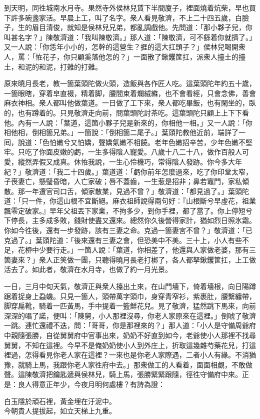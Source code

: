 到天明，同徃城南水月寺。果然寺外侯林兒賃下半間廈子，{}裡面燒着炕柴，早也買下許多碗盞家活。早晨上工，叫了名字。衆人看見敬濟，不上二十四五歲，白臉子，生的眉目清俊，就知是侯林兒兄弟，都亂調戲他。先問道：「那小夥子兒，你叫甚名字？」陳敬濟道：「我叫陳敬濟。」那人道：「陳敬濟，可不繇着你就擠了。」又一人說：「你恁年小小的，怎幹的這營生？捱的這大扛頭子？」{}侯林兒喝開衆人，罵：「恠花子，你只顧奚落他怎的？」一面散了鍬钁筐扛，派衆人擡土的擡土，和泥的和泥，打雜的打雜。

原來曉月長老，教一箇葉頭陀做火頭，造飯與各作匠人吃。這葉頭陀年約五十歲，一箇眼瞎，穿着皁直裰，精着脚，腰間束着爛絨縧，也不會看經，只會念佛，善會麻衣神相。衆人都叫他做葉道。一日做了工下來，衆人都吃畢飯，也有閑坐的，臥的，也有蹲着的。{}只見敬濟走向前，問葉頭陀討茶吃。這葉頭陀只顧上上下下看他。內有一人說：「葉道，這箇小夥子兒是新來的，你相他一相。」又一人說：「你相他相，倒相箇兄弟。」一箇說：「倒相箇二尾子。」葉頭陀教他近前，端詳了一囘，說道：「色怕嫩兮又怕嬌，聲嬌氣嫩不相饒。老年色嫩招辛苦，少年色嫩不堅牢。只吃了你面皮嫩的虧，一生多得陰人寵愛。八歲十八二十八，做作百般人可愛，縱然弄假又成真。休恠我說，一生心伶機巧，常得陰人發跡。你今多大年紀？」敬濟道：「我二十四歲。」葉道道：「虧你前年怎麼過來，吃了你印堂太窄，子䘮妻亡，懸璧昏暗，人亡家破；唇不蓋齒，一生惹是招非；鼻若竈門，家私傾散。那一年遭官司口舌，傾家散業，見過不曾？」敬濟道：「都見過了。」葉頭陀道：「只一件，你這山根不宜斷絕。麻衣祖師說得兩句好：『山根斷兮早虛花，祖業飄零定破家。』早年父祖丟下家業，不拘多少，到你手裡，都了當了。你上停短兮下停長，主多成多敗，錢財使盡又還來。總然你久後營得家計，猶如烈日照氷霜。你如今徃後，還有一步發跡，該有三妻之命。克過一箇妻宮不曾？」敬濟道：「已克過了。」葉頭陀道：「後來還有三妻之會，但恐美中不美。三十上，小人有些不足，花桺中少要行走。」一箇人說：「葉道，你相差了，他還與人家做老婆，那有三箇妻來？」衆人正笑做一團，只聽得曉月長老打梆了，各人都拏鍬钁筐扛，上工做活去了。如此者，敬濟在水月寺，也做了約一月光景。

一日，三月中旬天氣，敬濟正與衆人擡出土來，在山門墻下，倚着墻根，向日陽蹲踞着捉身上蝨蟣。只見一箇人，頭帶萬字頭巾，身穿青窄衫，紫裹肚，腰繫纏帶，脚穿扁靴，騎着一匹黃馬，手中提着一籃鮮花兒。{}見了敬濟，猛然跳下馬來，向前深深的唱了諾，便叫：「陳舅，小人那裡沒尋，你老人家原來在這裡。」倒唬了敬濟一跳。連忙還禮不迭，問：「哥哥，你是那裡來的？」那人道：「小人是守備周爺府中親隨張勝，自從舅舅府中官事出來，奶奶不好直到如今，老爺使小人那裡不找尋舅舅，不知在這裡。今早不是俺奶奶使小人到外庄上，折取這幾雜芍藥花兒，打這裡過，怎得看見你老人家在這裡？一來也是你老人家際遇，二者小人有緣。不消猶豫，就騎上馬，我跟你老人家徃府中去。」那衆做工的人看着，面面相覷，不敢做聲。{}這陳敬濟把鑰匙遞與侯林兒，騎上馬，張勝緊緊跟隨，徑徃守備府中來。正是：良人得意正年少，今夜月明何處樓？有詩為證：

\begin{myquote}
白玉隱於頑石裡，黃金埋在汙泥中。\\今朝貴人提拔起，如立天梯上九重。
\end{myquote}

